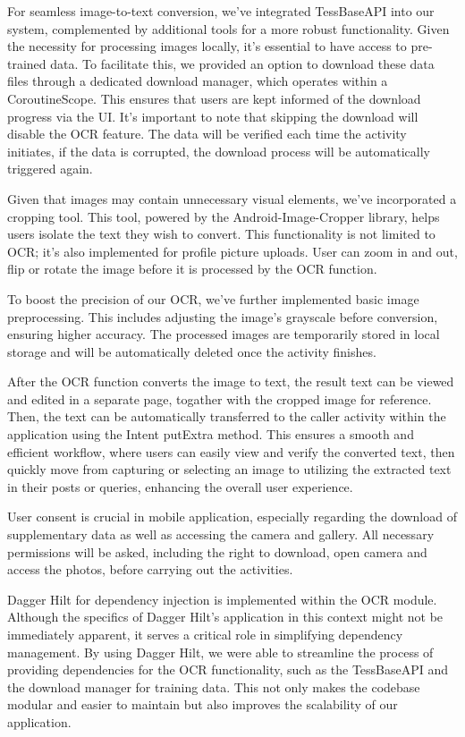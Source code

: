 For seamless image-to-text conversion, we've integrated TessBaseAPI into our system, complemented by additional tools for a more robust functionality. Given the necessity for processing images locally, it's essential to have access to pre-trained data. To facilitate this, we provided an option to download these data files through a dedicated download manager, which operates within a CoroutineScope. This ensures that users are kept informed of the download progress via the UI. It's important to note that skipping the download will disable the OCR feature. The data will be verified each time the activity initiates, if the data is corrupted, the download process will be automatically triggered again.

Given that images may contain unnecessary visual elements, we've incorporated a cropping tool. This tool, powered by the Android-Image-Cropper library, helps users isolate the text they wish to convert. This functionality is not limited to OCR; it's also implemented for profile picture uploads. User can zoom in and out, flip or rotate the image before it is processed by the OCR function.

To boost the precision of our OCR, we've further implemented basic image preprocessing. This includes adjusting the image's grayscale before conversion, ensuring higher accuracy. The processed images are temporarily stored in local storage and will be automatically deleted once the activity finishes.

After the OCR function converts the image to text, the result text can be viewed and edited in a separate page, togather with the cropped image for reference. Then, the text can be automatically transferred to the caller activity within the application using the Intent putExtra method. This ensures a smooth and efficient workflow, where users can easily view and verify the converted text, then quickly move from capturing or selecting an image to utilizing the extracted text in their posts or queries, enhancing the overall user experience.

User consent is crucial in mobile application, especially regarding the download of supplementary data as well as accessing the camera and gallery. All necessary permissions will be asked, including the right to download, open camera and access the photos, before carrying out the activities.

Dagger Hilt for dependency injection is implemented within the OCR module. Although the specifics of Dagger Hilt's application in this context might not be immediately apparent, it serves a critical role in simplifying dependency management. By using Dagger Hilt, we were able to streamline the process of providing dependencies for the OCR functionality, such as the TessBaseAPI and the download manager for training data. This not only makes the codebase modular and easier to maintain but also improves the scalability of our application.

